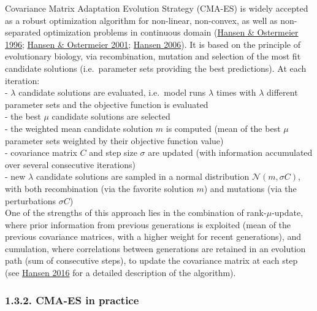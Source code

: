 \documentclass[11pt,]{article}
\begin{document}
Covariance Matrix Adaptation Evolution Strategy (CMA-ES) is widely
accepted as a robust optimization algorithm for non-linear, non-convex,
as well as non-separated optimization problems in continuous domain
(\protect\hyperlink{ref-Hansen1996}{Hansen \& Ostermeier 1996};
\protect\hyperlink{ref-Hansen2001}{Hansen \& Ostermeier 2001};
\protect\hyperlink{ref-Hansen2006}{Hansen 2006}). It is based on the
principle of evolutionary biology, via recombination, mutation and
selection of the most fit candidate solutions (i.e.~parameter sets
providing the best predictions). At each iteration:\\
- \(\lambda\) candidate solutions are evaluated, i.e.~model runs
\(\lambda\) times with \(\lambda\) different parameter sets and the
objective function is evaluated\\
- the best \(\mu\) candidate solutions are selected\\
- the weighted mean candidate solution \(m\) is computed (mean of the
best \(\mu\) parameter sets weighted by their objective function
value)\\
- covariance matrix \(C\) and step size \(\sigma\) are updated (with
information accumulated over several consecutive iterations)\\
- new \(\lambda\) candidate solutions are sampled in a normal
distribution \(\mathcal{N}(m, \sigma C)\), with both recombination (via
the favorite solution \(m\)) and mutations (via the perturbations
\(\sigma C\))\\
One of the strengths of this approach lies in the combination of
rank-\(\mu\)-update, where prior information from previous generations
is exploited (mean of the previous covariance matrices, with a higher
weight for recent generations), and cumulation, where correlations
between generations are retained in an evolution path (sum of
consecutive steps), to update the covariance matrix at each step (see
\protect\hyperlink{ref-Hansen2016}{Hansen 2016} for a detailed
description of the algorithm).

\hypertarget{cma-es-in-practice}{%
\subsubsection{1.3.2. CMA-ES in practice}\label{cma-es-in-practice}}
\end{document}
